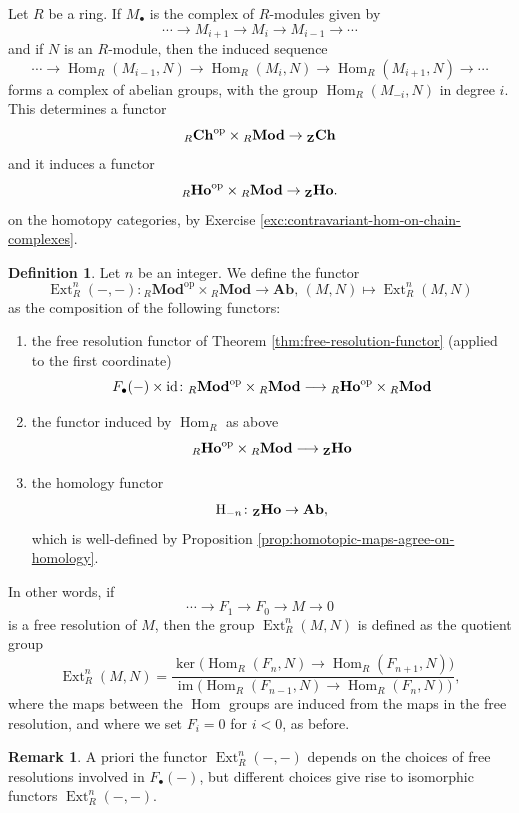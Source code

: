 \documentclass[11pt]{amsbook}
\newcommand{\longto}{\longrightarrow}
\DeclareMathOperator\Hom{Hom}
\DeclareMathOperator\Mod{{\bf{Mod}}}
\DeclareMathOperator\im{im}
\DeclareMathOperator\Ext{Ext}
\def\rH{{\mathrm H}} \def\rK{{\mathrm K}} \def\rR{{\mathrm R}}
\def\id{{\rm id}}
\def\opp{\mathrm{op}}
\def\Ab{\mathbf{Ab}}
\def\Mod{\mathbf{Mod}}
\def\Ch{\mathbf{Ch}}
\def\Ho{\mathbf{Ho}}
\theoremstyle{plain}
\theoremstyle{definition}
\newtheorem{definition}[theorem]{Definition}
\newtheorem{remark}[theorem]{Remark}
\begin{document}
Let $R$ be a ring. If $M_\bullet$ is the complex of $R$-modules given by
\[
	\cdots \longto M_{i+1} \longto   M_i \longto M_{i-1} \longto \cdots
\]
and if $N$ is an $R$-module, then the induced sequence 
\[
	\cdots \longto \Hom_R(M_{i-1}, N) \longto
	\Hom_R(M_i, N) \longto \Hom_R(M_{i+1}, N) \longto \cdots
\]
forms a complex of abelian groups, with the group $\Hom_R(M_{-i},N)$ in degree $i$. This determines a functor
\[
	{}_R\Ch^\opp \times {}_R\Mod \to {}_\bZ \Ch
\]
and  it induces a functor 
\[
	{}_R\Ho^\opp  \times {}_R\Mod \to {}_\bZ \Ho.
\]
on the homotopy categories,  by Exercise \ref{exc:contravariant-hom-on-chain-complexes}.


\begin{definition}
Let $n$ be an integer. We define the functor
\[
	\Ext^n_R(-,-) \colon {}_R\Mod^\opp \times {}_R\Mod \to \Ab,\,
	(M,N) \mapsto \Ext^n_R(M,N)
\]
as the composition of the following functors:
\begin{enumerate}
\item the free resolution functor of Theorem \ref{thm:free-resolution-functor} (applied to the first coordinate)
\[
	F_\bullet(-) \times \id \colon {}_R\Mod^\opp \times {}_R\Mod \longto {}_R \Ho^\opp \times {}_R\Mod
\]
\item the functor induced by $\Hom_R$ as above
\[
	 {}_R \Ho^\opp \times {}_R\Mod \longto {}_\bZ \Ho
\]
\item the homology functor
\[
	\rH_{-n} \colon  {}_\bZ \Ho \to \Ab,
\]
which is well-defined by Proposition \ref{prop:homotopic-maps-agree-on-homology}.
\end{enumerate}
\end{definition}

In other words, if
\[
	\cdots \longto F_1 \longto F_0 \longto M \longto 0
\]
is a free resolution of $M$, then the group $\Ext^n_R(M,N)$ is defined as
the quotient group
\[
	\Ext^n_R(M,N) = 
	\frac{ \ker \big( \Hom_R(F_n,N) \to \Hom_R(F_{n+1},N) \big)}
	{\im \big( \Hom_R(F_{n-1},N) \to \Hom_R(F_{n},N) \big)},
\]
where the maps between the $\Hom$ groups are induced from the maps in the free resolution, and where we set $F_i=0$ for $i<0$, as before.


\begin{remark}
A priori the functor $\Ext^n_R(-,-)$ depends on the choices of free resolutions involved in $F_\bullet(-)$, but different choices give rise to isomorphic functors $\Ext^n_R(-,-)$.
\end{remark}
\end{document}
